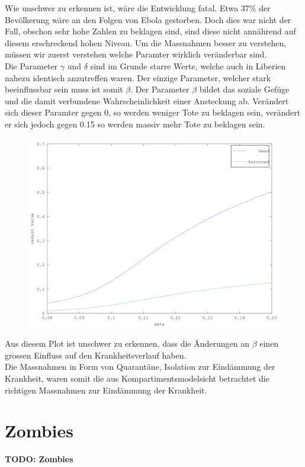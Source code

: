 \begin{refsection}
Wie unschwer zu erkennen ist, wäre die Entwicklung fatal. Etwa 37\% der Bevölkerung wäre an den Folgen von Ebola gestorben. Doch dies war nicht der Fall, obschon sehr hohe Zahlen zu beklagen sind, sind diese nicht annährend auf diesem erschreckend hohen Niveau. Um die Massnahmen besser zu verstehen, müssen wir zuerst verstehen welche Paramter wirklich veränderbar sind.
\\
Die Parameter $\gamma$ und $\delta$ sind im Grunde starre Werte, welche auch in Liberien nahezu identisch anzutreffen waren. Der einzige Parameter, welcher stark beeinflussbar sein muss ist somit $\beta$. Der Parameter $\beta$ bildet das soziale Gefüge und die damit verbundene Wahrscheinlichkeit einer Ansteckung ab. Verändert sich dieser Paramter gegen 0, so werden weniger Tote zu beklagen sein, verändert er sich jedoch gegen 0.15 so werden massiv mehr Tote zu beklagen sein.
\begin{figure}[H]
	\centering
	\includegraphics[width=1\textwidth]{sir/beta_change_det.png}
\end{figure}
Aus diesem Plot ist unschwer zu erkennen, dass die Änderungen an $\beta$ einen grossen Einfluss auf den Krankheitsverlauf haben.
\\
Die Massnahmen in Form von Quarantäne, Isolation zur Eindämmung der Krankheit, waren somit die aus Kompartimentsmodelsicht betrachtet die richtigen Massnahmen zur Eindämmung der Krankheit.

\section{Zombies}
\textbf{TODO: Zombies}


\end{refsection}
